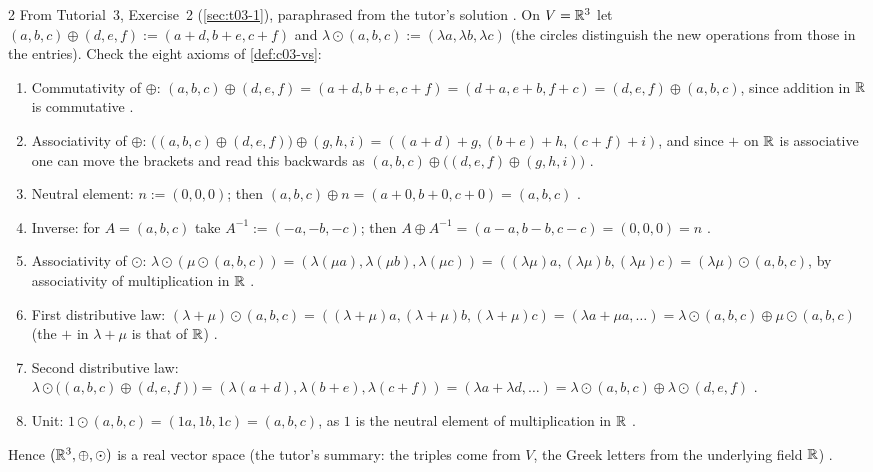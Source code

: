 \begin{paracol}{2}
From Tutorial~3, Exercise~2 (\cref{sec:t03-1}), paraphrased from the tutor's solution . On $V=\mathbb{R}^3$ let
$(a,b,c)\oplus(d,e,f):=(a+d,b+e,c+f)$ and $\lambda\odot(a,b,c):=(\lambda a,\lambda b,\lambda c)$ (the circles distinguish the new operations from those in the entries). Check the eight axioms of \cref{def:c03-vs}:
\begin{enumerate}
  \item Commutativity of $\oplus$: $(a,b,c)\oplus(d,e,f)=(a+d,b+e,c+f)=(d+a,e+b,f+c)=(d,e,f)\oplus(a,b,c)$, since addition in $\mathbb{R}$ is commutative .
  \item Associativity of $\oplus$: $\bigl((a,b,c)\oplus(d,e,f)\bigr)\oplus(g,h,i)=((a+d)+g,(b+e)+h,(c+f)+i)$, and since $+$ on $\mathbb{R}$ is associative one can move the brackets and read this backwards as $(a,b,c)\oplus\bigl((d,e,f)\oplus(g,h,i)\bigr)$ .
  \item Neutral element: $n:=(0,0,0)$; then $(a,b,c)\oplus n=(a+0,b+0,c+0)=(a,b,c)$ .
  \item Inverse: for $A=(a,b,c)$ take $A^{-1}:=(-a,-b,-c)$; then $A\oplus A^{-1}=(a-a,b-b,c-c)=(0,0,0)=n$ .
  \item Associativity of $\odot$: $\lambda\odot(\mu\odot(a,b,c))=(\lambda(\mu a),\lambda(\mu b),\lambda(\mu c))=((\lambda\mu)a,(\lambda\mu)b,(\lambda\mu)c)=(\lambda\mu)\odot(a,b,c)$, by associativity of multiplication in $\mathbb{R}$ .
  \item First distributive law: $(\lambda+\mu)\odot(a,b,c)=((\lambda+\mu)a,(\lambda+\mu)b,(\lambda+\mu)c)=(\lambda a+\mu a,\dots)=\lambda\odot(a,b,c)\oplus\mu\odot(a,b,c)$ (the $+$ in $\lambda+\mu$ is that of $\mathbb{R}$) .
  \item Second distributive law: $\lambda\odot\bigl((a,b,c)\oplus(d,e,f)\bigr)=(\lambda(a+d),\lambda(b+e),\lambda(c+f))=(\lambda a+\lambda d,\dots)=\lambda\odot(a,b,c)\oplus\lambda\odot(d,e,f)$ .
  \item Unit: $1\odot(a,b,c)=(1a,1b,1c)=(a,b,c)$, as $1$ is the neutral element of multiplication in $\mathbb{R}$ .
\end{enumerate}
Hence $(\mathbb{R}^3,\oplus,\odot)$ is a real vector space (the tutor's summary: the triples come from $V$, the Greek letters from the underlying field $\mathbb{R}$) .


\end{paracol}
